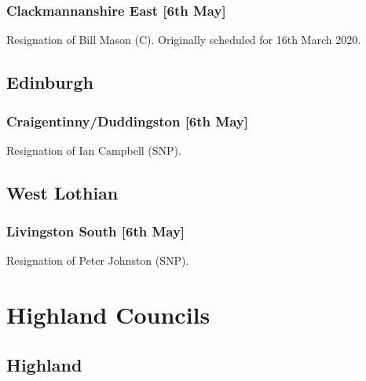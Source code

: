\documentclass[a4paper,openany]{book}
\begin{document}
\begin{resultsiii}
\subsubsection*{Clackmannanshire East \hspace*{\fill}\nolinebreak[1]%
	\enspace\hspace*{\fill}
	[6th May]}


Resignation of Bill Mason (C).  Originally scheduled for 16th March 2020.

\subsection*{Edinburgh}

\subsubsection*{Craigentinny/Duddingston \hspace*{\fill}\nolinebreak[1]%
	\enspace\hspace*{\fill}
	[6th May]}


Resignation of Ian Campbell (SNP).

\subsection*{West Lothian}

\subsubsection*{Livingston South \hspace*{\fill}\nolinebreak[1]%
	\enspace\hspace*{\fill}
	[6th May]}


Resignation of Peter Johnston (SNP).

\section{Highland Councils}

\subsection*{Highland}


\end{resultsiii}
\end{document}
